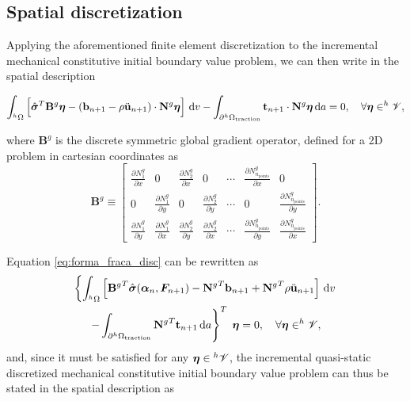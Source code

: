 \subsection{Spatial discretization} \label{sec:spatial_discretization}

Applying the aforementioned finite element discretization to the incremental mechanical constitutive initial boundary value problem, we can then write in the spatial description
\begin{highlight}
    \begin{equation}
        \int_{^h\Omega}\left[\hat{\bm{\sigma}}^T\mathbf B^g\bm{\eta} - (\mathbf b_{n+1} - \rho\ddot{\mathbf u}_{n+1}) \cdot \mathbf N^g \bm{\eta} \right]\,\mathrm{d} v -\int_{\partial ^h\Omega_\text{traction}} \mathbf t_{n+1}\cdot \mathbf N^g\bm{\eta} \,\mathrm{d} a = 0,\quad \forall \bm{\eta} \in ^h\mathscr{V},  \label{eq:forma_fraca_disc}
    \end{equation}
\end{highlight}
where $\mathbf B^g$ is the discrete symmetric global gradient operator, defined for a 2D problem in cartesian coordinates as
\begin{equation}
    \mathbf B^g\equiv \left[
    \begin{array}{ccccccc}
         \displaystyle{\frac{\partial N_1^g}{\partial x}} & 0 & \displaystyle{\frac{\partial N_2^g}{\partial x}} & 0 & \cdots &
         \displaystyle{\frac{\partial N_{n_\text{points}}^g}{\partial x}} & 0\\
         0 & \displaystyle{\frac{\partial N_1^g}{\partial y}} & 0 & \displaystyle{\frac{\partial N_2^g}{\partial y}} & \cdots &
         0 & \displaystyle{\frac{\partial N_{n_\text{points}}^g}{\partial y}}\\
         \displaystyle{\frac{\partial N_1^g}{\partial y}} & \displaystyle{\frac{\partial N_1^g}{\partial x}} & \displaystyle{\frac{\partial N_2^g}{\partial y}} & \displaystyle{\frac{\partial N_2^g}{\partial x}} & \cdots &
         \displaystyle{\frac{\partial N_{n_\text{points}}^g}{\partial y}} & \displaystyle{\frac{\partial N_{n_\text{points}}^g}{\partial x}}
    \end{array}
    \right].
\end{equation}

Equation \eqref{eq:forma_fraca_disc} can be rewritten as
\begin{multline}
    \left\{  \int_{^h\Omega}\left[{\mathbf B^g}^T \hat{\bm{\sigma}}(\bm{\alpha}_n, \bm{F}_{n+1})-{\mathbf N^g}^T\mathbf b_{n+1} +{\mathbf N^g}^T\rho\ddot{\mathbf u}_{n+1} \right]\,\mathrm{d} v \right. \\ \left. -\int_{\partial ^h\Omega_\text{traction}} {\mathbf N^g}^T \mathbf t_{n+1}\,\mathrm{d} a\right\}^T\;\bm{\eta} =0,\quad \forall \bm{\eta} \in ^h \mathscr{V}, \label{eq:eq_forças}
\end{multline}
and, since it must be satisfied for any $\bm{\eta} \in {}^h \mathscr{V}$, the incremental quasi-static discretized mechanical constitutive initial boundary value problem can thus be stated in the spatial description as


